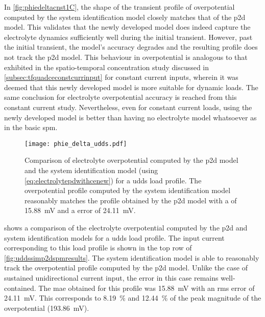 In \cref{fig:phiedeltacnst1C},   the  shape   of   the   transient  profile   of
overpotential  computed  by  the  system identification  model  closely  matches
that  of the  \gls{p2d} model.  This validates  that the  newly developed  model
does  indeed  capture the  electrolyte  dynamics  sufficiently well  during  the
initial transient.  However, past  the initial  transient, the  model's accuracy
degrades and  the resulting  profile does  not track  the \gls{p2d}  model. This
behaviour in overpotential is analogous to that exhibited in the spatio-temporal
concentration   study   discussed  in \cref{subsec:tfquadceconstcurrinput}   for
constant current inputs,  wherein it was deemed that this  newly developed model
is  more  suitable  for  dynamic  loads. The  same  conclusion  for  electrolyte
overpotential   accuracy  is   reached   from  this   constant  current   study.
Nevertheless, even for  constant current loads, using the  newly developed model
is better than having no electrolyte model whatsoever as in the basic \gls{spm}.


\begin{figure}[!htbp]
    \centering
    \texttt{[image: phie\_delta\_udds.pdf]}
    \caption[%
    Electrolyte  overpotential  computed  by the    and  system
    identification models for a  load profile
    ]%
    {%
        Comparison    of    electrolyte    overpotential   computed    by    the
        \gls{p2d}     model    and     the    system     identification    model
        (using \cref{eq:electrolytepdwithcenew}) for a  \gls{udds} load profile.
        The overpotential  profile computed  by the system  identification model
        reasonably matches  the profile obtained  by the \gls{p2d} model  with a
         of \SI{15.88}{\milli\volt} and  a  error of
        \SI{24.11}{\milli\volt}.
    }%
    \label{fig:phiedeltacnstudds}
\end{figure}

 shows a comparison of the electrolyte overpotential
computed by the \gls{p2d} and system identification models for a \gls{udds} load
profile. The  input current corresponding to  this load profile is  shown in the
top row  of \cref{fig:uddssimp2dspmresults}. The system identification  model is
able to  reasonably track  the overpotential profile  computed by  the \gls{p2d}
model. Unlike the  case of sustained unidirectional current input,  the error in
this case  remains well-contained. The  \gls{mae} obtained for this  profile was
\SI{15.88}{\milli\volt}  with  an  \gls{rms} error  of  \SI{24.11}{\milli\volt}.
This  corresponds to  \SI{8.19}{\percent} and  \SI{12.44}{\percent} of  the peak
magnitude of the overpotential (\SI{193.86}{\milli\volt}).

